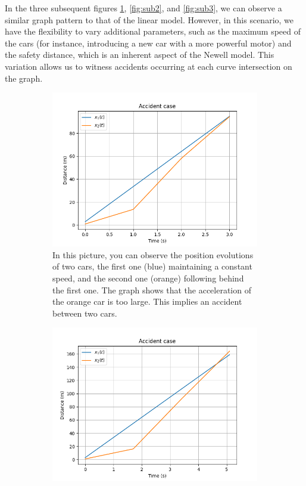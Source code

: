\documentclass{article}
\begin{document}
		In the three subsequent figures \ref{fig:sub1}, \ref{fig:sub2}, and \ref{fig:sub3}, we can observe a similar graph pattern to that of the linear model. However, in this scenario, we have the flexibility to vary additional parameters, such as the maximum speed of the cars (for instance, introducing a new car with a more powerful motor) and the safety distance, which is an inherent aspect of the Newell model. This variation allows us to witness accidents occurring at each curve intersection on the graph.
		
		
		\begin{figure}[H]
			\centering
			\begin{subfigure}[b]{0.45\textwidth}
				\centering
				\includegraphics[width=\textwidth]{1W2_Acc1.png}
				\caption{In this picture, you can observe the position evolutions of two cars, the first one (blue) maintaining a constant speed, and the second one (orange) following behind the first one. The graph shows that the acceleration of the orange car is too large. This implies an accident between two cars.}
				\label{fig:sub1}
			\end{subfigure}
			\hfill
			\begin{subfigure}[b]{0.45\textwidth}
				\centering
				\includegraphics[width=\textwidth]{1W2_Acc2.png}

\end{subfigure}
\end{figure}
\end{document}
